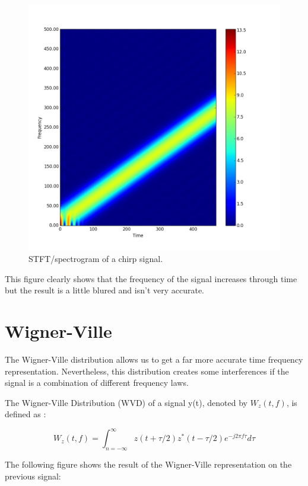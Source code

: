 \begin{figure}[H]
\centering
    \includegraphics[scale=0.6,angle=0]{Images/Chirp_STFT.png}
    \caption{STFT/spectrogram of a chirp signal.}
    \label{fig:Chirp_STFT}
\end{figure}

This figure clearly shows that the frequency of the signal increases through time but the result is a little blured and isn't very accurate.

\chapter{Wigner-Ville}

The Wigner-Ville distribution allows us to get a far more accurate time frequency representation. Nevertheless, this distribution creates some interferences if the signal is a combination of different frequency laws.

The Wigner-Ville Distribution (WVD) of a signal y(t), denoted by $W_z(t,f)$, is defined as :

\begin{equation}
W_z(t,f) = \int_{n=-\infty}^{\infty} z ( t + \tau / 2 ) z^* (t - \tau / 2) e^{-j 2 \pi f \tau} d \tau
\end{equation}

The following figure shows the result of the Wigner-Ville representation on the previous signal:

